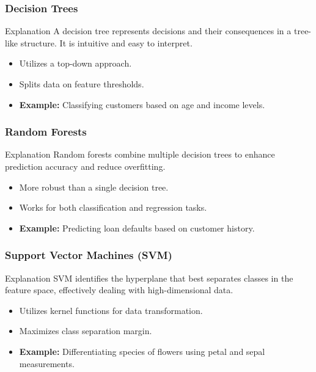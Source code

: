 \documentclass[aspectratio=169]{beamer}
\begin{document}
\begin{frame}[fragile]
    \frametitle{Decision Trees}
    \begin{block}{Explanation}
        A decision tree represents decisions and their consequences in a tree-like structure. It is intuitive and easy to interpret.
    \end{block}
    \begin{itemize}
        \item Utilizes a top-down approach.
        \item Splits data on feature thresholds.
        \item \textbf{Example:} Classifying customers based on age and income levels.
    \end{itemize}
\end{frame}

\begin{frame}[fragile]
    \frametitle{Random Forests}
    \begin{block}{Explanation}
        Random forests combine multiple decision trees to enhance prediction accuracy and reduce overfitting.
    \end{block}
    \begin{itemize}
        \item More robust than a single decision tree.
        \item Works for both classification and regression tasks.
        \item \textbf{Example:} Predicting loan defaults based on customer history.
    \end{itemize}
\end{frame}

\begin{frame}[fragile]
    \frametitle{Support Vector Machines (SVM)}
    \begin{block}{Explanation}
        SVM identifies the hyperplane that best separates classes in the feature space, effectively dealing with high-dimensional data.
    \end{block}
    \begin{itemize}
        \item Utilizes kernel functions for data transformation.
        \item Maximizes class separation margin.
        \item \textbf{Example:} Differentiating species of flowers using petal and sepal measurements.
    \end{itemize}
\end{frame}
\end{document}
